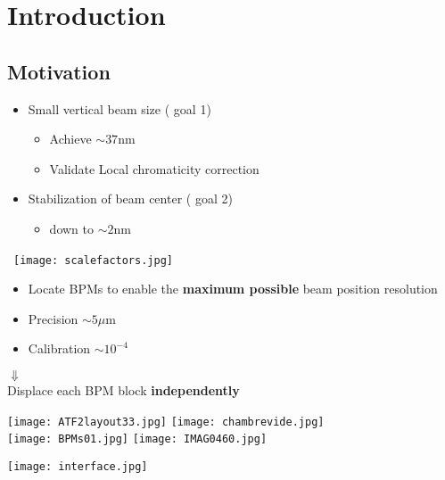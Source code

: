 \chapter{Introduction}
\section{Motivation}
{\Large
 \begin{itemize}
  \item Small vertical beam size ({\color{red} goal 1})
  \begin{itemize}
   \item Achieve $\sim 37$nm
   \item Validate Local chromaticity correction
  \end{itemize}
  \item Stabilization of beam center ({\color{blue} goal 2})
  \begin{itemize}
   \item down to $\sim2$nm
  \end{itemize}
 \end{itemize}
}
 $\,$
  \texttt{[image: scalefactors.jpg]}
{\LARGE
  \begin{itemize}
   \item Locate BPMs to enable the \textbf{ maximum possible} beam position resolution
   \item Precision $\sim 5\mu$m
   \item Calibration $\sim 10^{-4}$
  \end{itemize}
 \hspace*{5cm}$\Downarrow$\\
 Displace each BPM block \textbf{independently}
 }\par
\texttt{[image: ATF2layout33.jpg]}
\hspace{1cm}
\texttt{[image: chambrevide.jpg]}\\
\hspace*{1cm}\texttt{[image: BPMs01.jpg]}\hspace*{0.2cm}
\texttt{[image: IMAG0460.jpg]}\par
\texttt{[image: interface.jpg]}
